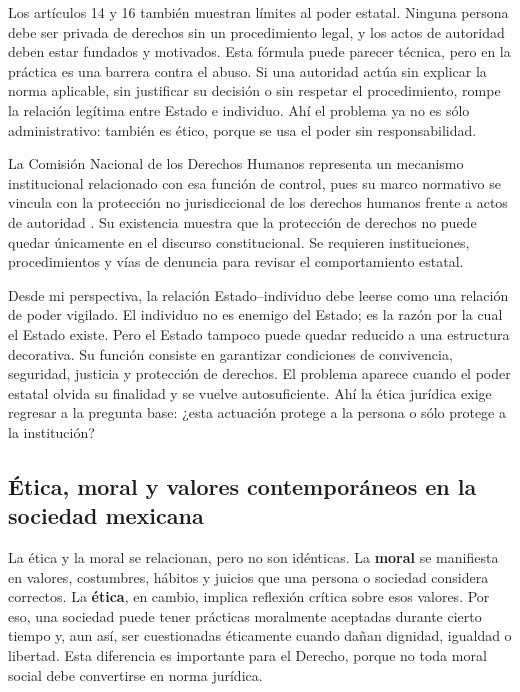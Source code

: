 \documentclass[
	spanish,
	letterpaper, oneside
]{article}
\begin{document}
Los artículos 14 y 16 también muestran límites al poder estatal. Ninguna persona debe ser privada de derechos sin un procedimiento legal, y los actos de autoridad deben estar fundados y motivados. Esta fórmula puede parecer técnica, pero en la práctica es una barrera contra el abuso. Si una autoridad actúa sin explicar la norma aplicable, sin justificar su decisión o sin respetar el procedimiento, rompe la relación legítima entre Estado e individuo. Ahí el problema ya no es sólo administrativo: también es ético, porque se usa el poder sin responsabilidad.

La Comisión Nacional de los Derechos Humanos representa un mecanismo institucional relacionado con esa función de control, pues su marco normativo se vincula con la protección no jurisdiccional de los derechos humanos frente a actos de autoridad \citep{cndhMarcoNormativo}. Su existencia muestra que la protección de derechos no puede quedar únicamente en el discurso constitucional. Se requieren instituciones, procedimientos y vías de denuncia para revisar el comportamiento estatal.

Desde mi perspectiva, la relación Estado--individuo debe leerse como una relación de poder vigilado. El individuo no es enemigo del Estado; es la razón por la cual el Estado existe. Pero el Estado tampoco puede quedar reducido a una estructura decorativa. Su función consiste en garantizar condiciones de convivencia, seguridad, justicia y protección de derechos. El problema aparece cuando el poder estatal olvida su finalidad y se vuelve autosuficiente. Ahí la ética jurídica exige regresar a la pregunta base: ¿esta actuación protege a la persona o sólo protege a la institución?

\subsection{Ética, moral y valores contemporáneos en la sociedad mexicana}

La ética y la moral se relacionan, pero no son idénticas. La \textbf{moral} se manifiesta en valores, costumbres, hábitos y juicios que una persona o sociedad considera correctos. La \textbf{ética}, en cambio, implica reflexión crítica sobre esos valores. Por eso, una sociedad puede tener prácticas moralmente aceptadas durante cierto tiempo y, aun así, ser cuestionadas éticamente cuando dañan dignidad, igualdad o libertad. Esta diferencia es importante para el Derecho, porque no toda moral social debe convertirse en norma jurídica.
\end{document}

